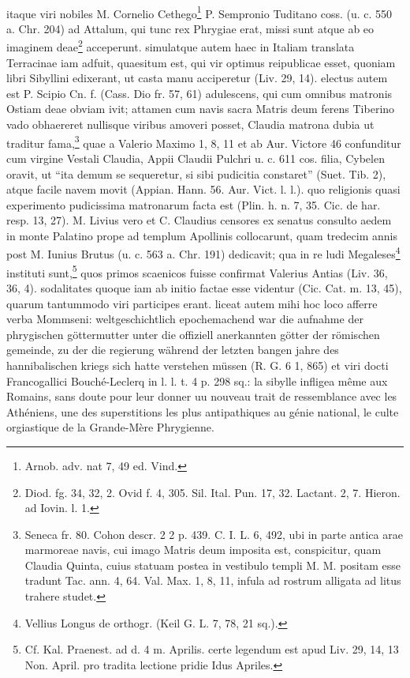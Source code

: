 \documentclass[a4paper, 11pt, oneside, polutonikogreek, german]{article}
\begin{document}
\paragraph{}
itaque viri nobiles M. Cornelio Cethego\footnote{Arnob. adv. nat 7, 49 ed. Vind.} P. Sempronio Tuditano coss. (u. c. 550 a. Chr. 204) ad Attalum, qui tunc rex Phrygiae erat, missi sunt atque ab eo imaginem deae\footnote{Diod. fg. 34, 32, 2. Ovid f. 4, 305. Sil. Ital. Pun. 17, 32. Lactant. 2, 7. Hieron. ad Iovin. l. 1.} acceperunt. simulatque autem haec in Italiam translata Terracinae iam adfuit, quaesitum est, qui vir optimus reipublicae esset, quoniam libri Sibyllini edixerant, ut casta manu acciperetur (Liv. 29, 14). electus autem est P. Scipio Cn. f. (Cass. Dio fr. 57, 61) adulescens, qui cum omnibus matronis Ostiam deae obviam ivit; attamen cum navis sacra Matris deum ferens Tiberino vado obhaereret nullisque viribus amoveri posset, Claudia matrona dubia ut traditur fama,\footnote{Seneca fr. 80. Cohon descr. 2 2 p. 439. C. I. L. 6, 492, ubi in parte antica arae marmoreae navis, cui imago Matris deum imposita est, conspicitur, quam Claudia Quinta, cuius statuam postea in vestibulo templi M. M. positam esse tradunt Tac. ann. 4, 64. Val. Max. 1, 8, 11, infula ad rostrum alligata ad litus trahere studet.} quae a Valerio Maximo 1, 8, 11 et ab Aur. Victore 46 confunditur cum virgine Vestali Claudia, Appii Claudii Pulchri u. c. 611 cos. filia, Cybelen oravit, ut "`ita demum se sequeretur, si sibi pudicitia constaret"' (Suet. Tib. 2), atque facile navem movit (Appian. Hann. 56. Aur. Vict. l. l.). quo religionis quasi experimento pudicissima matronarum facta est (Plin. h. n. 7, 35. Cic. de har. resp. 13, 27). M. Livius vero et C. Claudius censores ex senatus consulto aedem in monte Palatino prope ad templum Apollinis collocarunt, quam tredecim annis post M. Iunius Brutus (u. c. 563 a. Chr. 191) dedicavit; qua in re ludi Megaleses\footnote{Vellius Longus de orthogr. (Keil G. L. 7, 78, 21 sq.).} instituti sunt,\footnote{Cf. Kal. Praenest. ad d. 4 m. Aprilis. certe legendum est apud Liv. 29, 14, 13 Non. April. pro tradita lectione pridie Idus Apriles.} quos primos scaenicos fuisse confirmat Valerius Antias (Liv. 36, 36, 4). sodalitates quoque iam ab initio factae esse videntur (Cic. Cat. m. 13, 45), quarum tantummodo viri participes erant. liceat autem mihi hoc loco afferre verba Mommseni: weltgeschichtlich epochemachend war die aufnahme der phrygischen göttermutter unter die offiziell anerkannten götter der römischen gemeinde, zu der die regierung während der letzten bangen jahre des hannibalischen kriegs sich hatte verstehen müssen (R. G. 6 1, 865) et viri docti Francogallici Bouché-Leclerq in l. l. t. 4 p. 298 sq.: la sibylle infligea même aux Romains, sans doute pour leur donner uu nouveau trait de ressemblance avec les Athéniens, une des superstitions les plus antipathiques au génie national, le culte orgiastique de la Grande-Mère Phrygienne.
\end{document}
